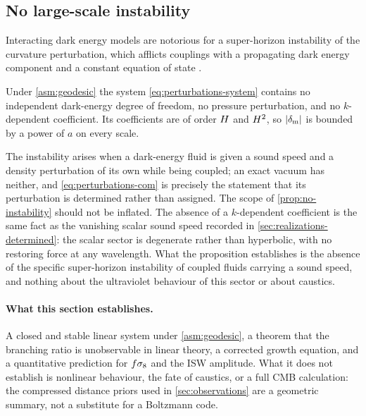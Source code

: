 \subsection{No large-scale instability}\label{sec:perturbations-stability}

Interacting dark energy models are notorious for a super-horizon instability of
the curvature perturbation, which afflicts couplings with a propagating dark
energy component and a constant equation of state
\parencite{valiviita2008_08040232}.

\begin{proposition}\label{prop:no-instability}
  Under \cref{asm:geodesic} the system \cref{eq:perturbations-system} contains
  no independent dark-energy degree of freedom, no pressure perturbation, and
  no $k$-dependent coefficient. Its coefficients are of order $H$ and
  $H^2$, so $|\delta_{\rm m}|$ is bounded by a power of $a$ on every scale.
\end{proposition}

The instability arises when a dark-energy fluid is given a sound speed and a
density perturbation of its own while being coupled; an exact vacuum has
neither, and \cref{eq:perturbations-com} is precisely the statement that its
perturbation is determined rather than assigned. 
The scope of \cref{prop:no-instability} should not be inflated. The absence of a
$k$-dependent coefficient is the same fact as the vanishing scalar sound speed
recorded in \cref{sec:realizations-determined}: the scalar sector is degenerate
rather than hyperbolic, with no restoring force at any wavelength. What the
proposition establishes is the absence of the specific super-horizon instability
of coupled fluids carrying a sound speed, and nothing about the ultraviolet
behaviour of this sector or about caustics.

\paragraph{What this section establishes.}
A closed and stable linear system under \cref{asm:geodesic}, a theorem that the
branching ratio is unobservable in linear theory, a corrected growth equation,
and a quantitative prediction for $f\sigma_{8}$ and the ISW amplitude. What it does
not establish is nonlinear behaviour, the fate of caustics, or a full CMB
calculation: the compressed distance priors used in \cref{sec:observations} are
a geometric summary, not a substitute for a Boltzmann code.
